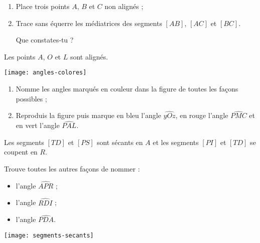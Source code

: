 \begin{exercice}
 \begin{enumerate}
 \item Place trois points $A$, $B$ et $C$ non alignés ;
 \item Trace sans équerre les médiatrices des segments $[AB]$, $[AC]$ et $[BC]$. 
 
 Que constates‑tu ?
 \end{enumerate}
\end{exercice}


\newpage






\begin{exercice}
Les points $A$, $O$ et $L$ sont alignés.
 \begin{center} \texttt{[image: angles-colores]}  \end{center}
\begin{enumerate}
 \item Nomme les angles marqués en couleur dans la figure de toutes les façons possibles ; 
 \item Reproduis la figure puis marque en bleu l'angle $\widehat{yOz}$, en rouge l'angle $\widehat{PMC}$ et en vert l'angle $\widehat{PAL}$.
 \end{enumerate}
\end{exercice}


\begin{exercice}
Les segments $[TD]$ et $[PS]$ sont sécants en $A$ et les segments $[PI]$ et $[TD]$ se coupent en $R$.

Trouve toutes les autres façons de nommer : \\[0.5em]
\begin{minipage}[c]{0.2\textwidth}
\begin{itemize}
 \item l'angle $\widehat{APR}$ ;
 \item l'angle $\widehat{RDI}$ ;
 \item l'angle $\widehat{PDA}$.
 \end{itemize}
 \end{minipage} \hfill%
  \begin{minipage}[c]{0.4\textwidth}
  \texttt{[image: segments-secants]}
  \end{minipage} \\
\end{exercice}  


